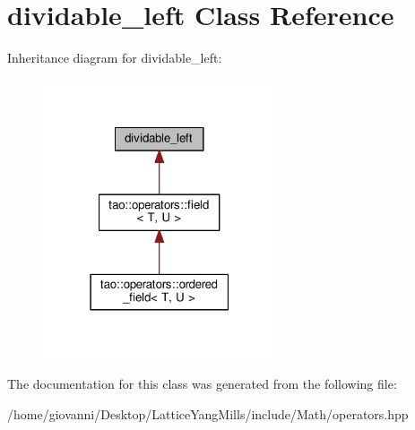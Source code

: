\hypertarget{classdividable__left}{}\section{dividable\+\_\+left Class Reference}
\label{classdividable__left}


Inheritance diagram for dividable\+\_\+left\+:\nopagebreak
\begin{figure}[H]
\begin{center}
\leavevmode
\includegraphics[width=195pt]{classdividable__left__inherit__graph}
\end{center}
\end{figure}


The documentation for this class was generated from the following file\+:\begin{DoxyCompactItemize}
\item 
/home/giovanni/\+Desktop/\+Lattice\+Yang\+Mills/include/\+Math/operators.\+hpp\end{DoxyCompactItemize}
